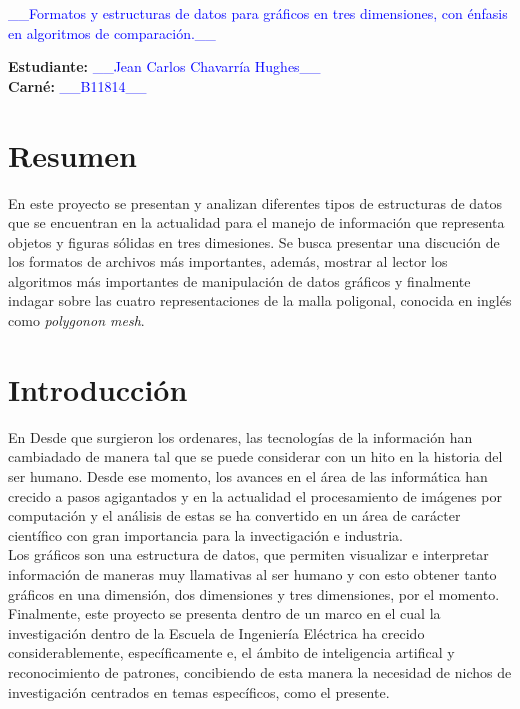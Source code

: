 \documentclass[letterpaper]{article}
\newcommand{\uic}{blue} %
\newcommand{\uim}{\_\_} %
\newcommand{\userinput}[1]{\textcolor{\uic}{\uim#1\uim}}
\begin{document}
\vspace*{2cm}

\begin{center}
\Huge
\userinput{Formatos y estructuras de datos para gr\' aficos en tres dimensiones, con \' enfasis en algoritmos de comparaci\' on.}
\vspace*{1cm}
\end{center}

\noindent
\small\baselineskip=14pt
\textbf{Estudiante:} \userinput{Jean Carlos Chavarría Hughes}\\
\textbf{Carné:} \userinput{B11814}\\

\section{Resumen}
En este proyecto se presentan y analizan diferentes tipos de estructuras de datos que se encuentran en la actualidad para el manejo de informaci\' on que representa objetos y figuras s\' olidas en tres dimesiones. Se busca presentar una discuci\' on de los formatos de archivos m\' as importantes, adem\' as, mostrar al lector los algoritmos m\' as importantes de manipulaci\' on de datos gr\' aficos y finalmente indagar sobre las cuatro representaciones de la malla poligonal, conocida en ingl\' es como \textit{polygonon mesh}.
\section{Introducción}

En Desde que surgieron los ordenares, las tecnolog\' ias de la informaci\' on han cambiadado de manera tal que se puede considerar con un hito en la historia del ser humano. Desde ese momento, los avances en el \' area de las inform\' atica han crecido a pasos agigantados y en la actualidad el procesamiento de im\' agenes por computaci\' on y el an\' alisis de estas se ha convertido en un \' area de car\' acter cient\' ifico con gran importancia para la invectigaci\' on e industria.\\
Los gr\' aficos son una estructura de datos, que permiten visualizar e interpretar informaci\' on de maneras muy llamativas al ser humano y con esto obtener tanto gr\' aficos en una dimensi\' on, dos dimensiones y tres dimensiones, por el momento.\\
Finalmente, este proyecto se presenta dentro de un marco en el cual la investigaci\' on dentro de la Escuela de Ingenier\' ia El\' ectrica ha crecido considerablemente, espec\' ificamente e, el \' ambito de inteligencia artifical y reconocimiento de patrones, concibiendo de esta manera la necesidad de nichos de investigaci\' on centrados en temas espec\' ificos, como el presente.
\end{document}
